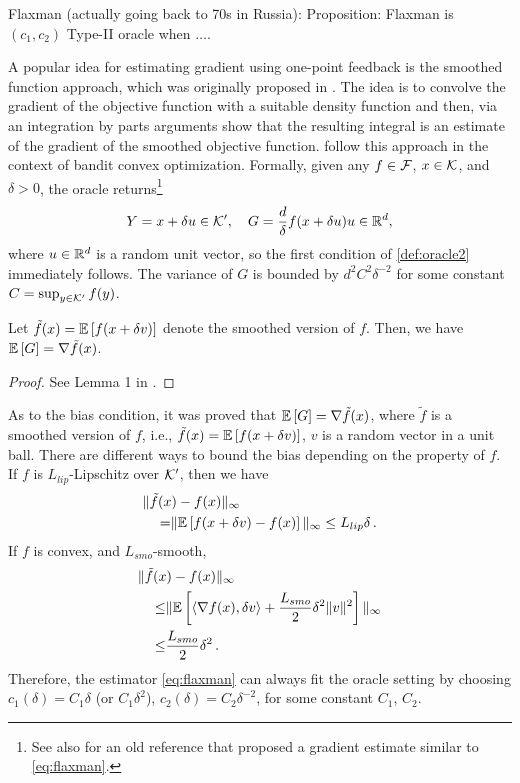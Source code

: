 Flaxman (actually going back to 70s in Russia): 
Proposition:  Flaxman is $(c_1,c_2)$ Type-II oracle when $\dots$. 

A popular idea for estimating gradient using one-point feedback is the smoothed function approach, which was originally proposed in \citep{katkul}. The idea is to convolve the gradient of the objective function with a suitable density function and then, via an integration by parts arguments show that the resulting integral is an estimate of the gradient of the smoothed objective function. 
\cite{flaxman2005online} follow this approach in the context of bandit convex optimization.
Formally,  
given any $f \in \mathcal{F}$, $x \in \mathcal{K}$, and $\delta >0$, the oracle returns\footnote{See also \cite[pp.~58-60]{kushcla} for an old reference that proposed a gradient estimate similar to \eqref{eq:flaxman}.}   
\begin{align}
 Y = x+\delta u \in \mathcal{K}', \quad
 G = \dfrac{d}{\delta}f(x+\delta u)u \in \mathbb{R}^d, \label{eq:flaxman}
\end{align}
where $u\in \mathbb{R}^d$ is a random unit vector, so the first condition of \cref{def:oracle2} immediately follows. 
The variance of $G$ is bounded by $d^2C^2 \delta^{-2}$ for some constant $C = \sup_{y\in \mathcal{K}'}f(y)$. 
\begin{proposition}
Let $\tilde{f}(x) = \mathbb{E}\left[f(x+\delta v)\right]$ denote the smoothed version of $f$. Then, we have
$\mathbb{E}\left[G\right] = \nabla \tilde{f}(x)$.
\end{proposition}
\begin{proof}
 See Lemma 1 in \citep{flaxman2005online}.
\end{proof}
 As to the bias condition, it was proved that $\mathbb{E}\left[G\right] = \nabla \tilde{f}(x)$, where $\tilde{f}$ is a smoothed version of $f$, i.e.,
$\tilde{f}(x) = \mathbb{E}\left[f(x+\delta v)\right]$,
$v$ is a random vector in a unit ball. There are different ways to bound the bias depending on the property of $f$.
If $f$ is $L_{lip}$-Lipschitz over $\mathcal{K}'$, then we have
\begin{align*}
\MoveEqLeft
\norm{\tilde{f}(x)-f(x)}_\infty \\
=&\norm{\EE{f(x+\delta v)-f(x)}}_\infty
\le L_{lip} \delta \,.
\end{align*}
If $f$ is convex, and $L_{smo}$-smooth, 
\begin{align*}
\MoveEqLeft
\norm{\tilde{f}(x)-f(x)}_\infty \\
\le& \norm{\EE{\ip{\nabla f(x), \delta v}+\dfrac{L_{smo}}{2}\delta^2\norm{v}^2}}_\infty\\
\le &\dfrac{L_{smo}}{2}\delta^2 \,.
\end{align*}
Therefore, the estimator \eqref{eq:flaxman} can always fit the oracle setting by choosing $c_1(\delta) = C_1 \delta$ (or $C_1\delta^2$), $c_2(\delta) = C_2 \delta^{-2}$, for some constant $C_1$, $C_2$.

